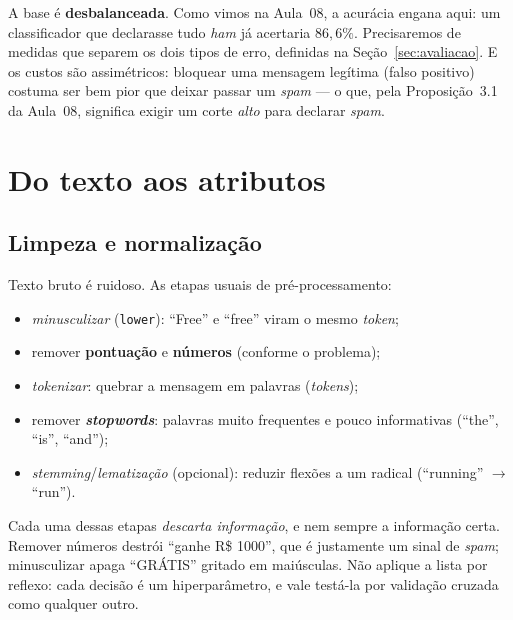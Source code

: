 \documentclass[11pt,a4paper]{article}
\begin{document}
\begin{atencao}
A base é \textbf{desbalanceada}. Como vimos na Aula~08, a acurácia engana aqui: um
classificador que declarasse tudo \emph{ham} já acertaria $86{,}6\%$. Precisaremos de
medidas que separem os dois tipos de erro, definidas na Seção~\ref{sec:avaliacao}. E
os custos são assimétricos: bloquear uma mensagem
legítima (falso positivo) costuma ser bem pior que deixar passar um \emph{spam} ---
o que, pela Proposição~3.1 da Aula~08, significa exigir um corte \emph{alto} para
declarar \emph{spam}.
\end{atencao}

\section{Do texto aos atributos}
\subsection{Limpeza e normalização}
Texto bruto é ruidoso. As etapas usuais de pré-processamento:
\begin{itemize}[leftmargin=1.4cm,nosep]
  \item \emph{minusculizar} (\texttt{lower}): ``Free'' e ``free'' viram o mesmo
        \emph{token};
  \item remover \textbf{pontuação} e \textbf{números} (conforme o problema);
  \item \emph{tokenizar}: quebrar a mensagem em palavras (\emph{tokens});
  \item remover \textbf{\emph{stopwords}}: palavras muito frequentes e pouco
        informativas (``the'', ``is'', ``and'');
  \item \emph{stemming}/\emph{lematização} (opcional): reduzir flexões a um radical
        (``running'' $\to$ ``run'').
\end{itemize}

\begin{atencao}
Cada uma dessas etapas \emph{descarta informação}, e nem sempre a informação certa.
Remover números destrói ``ganhe R\$ 1000'', que é justamente um sinal de
\emph{spam}; minusculizar apaga ``GRÁTIS'' gritado em maiúsculas. Não aplique a
lista por reflexo: cada decisão é um hiperparâmetro, e vale testá-la por validação
cruzada como qualquer outro.
\end{atencao}
\end{document}
